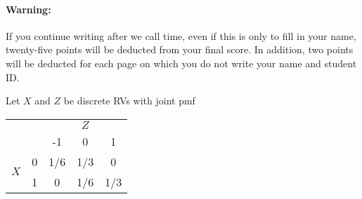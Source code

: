 \documentclass[addpoints,12pt]{exam}
\begin{document}
\paragraph{Warning:} If you continue writing after we call time, even if this is only to fill in your name, twenty-five points will be deducted from your final score. In addition, two points will be deducted for each page on which you do not write your name and student ID. 

\newpage
\begin{questions}
\question Let $X$ and $Z$ be discrete RVs with joint pmf
  			\begin{center}
				\begin{tabular}{|cc|ccc|}
				\hline
				&&\multicolumn{3}{c|}{$Z$}\\
				&&-1 & 0 & 1\\
				\hline
				\multirow{2}{*}{$X$}
				&0& 1/6 & 1/3 & 0\\
				&1& 0 & 1/6 & 1/3\\
				\hline
				\end{tabular}
			\end{center}
\end{questions}
\end{document}
